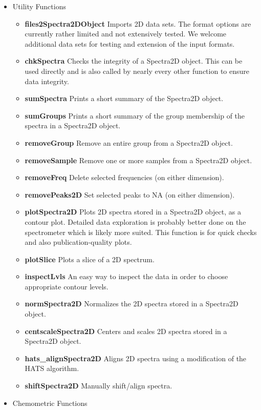 \documentclass[letter,10pt,twocolumn,twoside,printwatermark=false]{pinp}
\providecommand{\tightlist}{%
  \setlength{\itemsep}{0pt}\setlength{\parskip}{0pt}}
\begin{document}
\begin{itemize}
\tightlist
\item
  Utility Functions

  \begin{itemize}
  \tightlist
  \item
    \textbf{files2Spectra2DObject} Imports 2D data sets. The format
    options are currently rather limited and not extensively tested. We
    welcome additional data sets for testing and extension of the input
    formats.
  \item
    \textbf{chkSpectra} Checks the integrity of a Spectra2D object. This
    can be used directly and is also called by nearly every other
    function to ensure data integrity.
  \item
    \textbf{sumSpectra} Prints a short summary of the Spectra2D object.
  \item
    \textbf{sumGroups} Prints a short summary of the group membership of
    the spectra in a Spectra2D object.
  \item
    \textbf{removeGroup} Remove an entire group from a Spectra2D object.
  \item
    \textbf{removeSample} Remove one or more samples from a Spectra2D
    object.
  \item
    \textbf{removeFreq} Delete selected frequencies (on either
    dimension).
  \item
    \textbf{removePeaks2D} Set selected peaks to NA (on either
    dimension).
  \item
    \textbf{plotSpectra2D} Plots 2D spectra stored in a Spectra2D
    object, as a contour plot. Detailed data exploration is probably
    better done on the spectrometer which is likely more suited. This
    function is for quick checks and also publication-quality plots.
  \item
    \textbf{plotSlice} Plots a slice of a 2D spectrum.
  \item
    \textbf{inspectLvls} An easy way to inspect the data in order to
    choose appropriate contour levels.
  \item
    \textbf{normSpectra2D} Normalizes the 2D spectra stored in a
    Spectra2D object.
  \item
    \textbf{centscaleSpectra2D} Centers and scales 2D spectra stored in
    a Spectra2D object.
  \item
    \textbf{hats\_alignSpectra2D} Aligns 2D spectra using a modification
    of the HATS algorithm.
  \item
    \textbf{shiftSpectra2D} Manually shift/align spectra.
  \end{itemize}
\item
  Chemometric Functions


\end{itemize}
\end{document}
